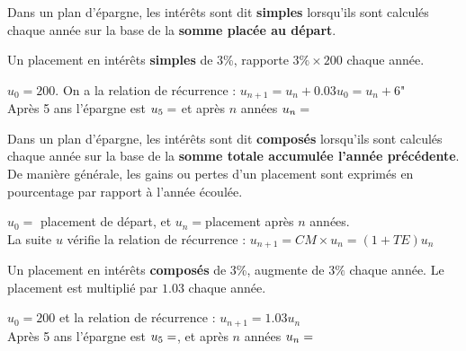 \documentclass[main.tex]{subfiles}
\begin{document}
 
 
 \newpage 
 
  \begin{eBox}
 	Dans un plan d'épargne, les intérêts sont dit \textbf{simples} lorsqu'ils sont calculés chaque année sur la base de la \textbf{somme placée au départ}. 
 \end{eBox}   
 \begin{example} 
	Un placement   en intérêts \textbf{simples} de 3\%, rapporte $3\%\times 200$ chaque année.
 	
\noindent  $u_0=200$. On a la relation de récurrence : $u_{n+1}= u_n+ 0.03u_0=u_n+6$"\\
Après 5 ans l'épargne est $u_5= \dotfill  $ et après $n$ années $u_n=\dotfill$

 \end{example}
 \begin{eBox}
 	Dans un plan d'épargne, les intérêts sont dit \textbf{composés} lorsqu'ils sont calculés chaque année sur la base de la \textbf{somme totale  accumulée l'année précédente}. De manière générale, les gains ou pertes d'un placement sont exprimés en pourcentage par rapport à l'année écoulée. 
 	
 \noindent	  $u_0=$   placement de départ, et $u_n=$placement après $n$ années. \\
 La suite $u$ vérifie la relation de récurrence :
 	$u_{n+1}=CM \times u_n=(1+TE) u_n$ 
 \end{eBox} 
\begin{example} 
Un placement   en intérêts \textbf{composés} de 3\%, augmente de $3\%$ chaque année. Le placement est multiplié par $1.03$ chaque année.
 
\noindent $u_0=200$ et la relation de récurrence : $u_{n+1}=1.03u_n$\\
Après 5 ans l'épargne est $u_5=  \dotfill  $, et après $n$ années $u_n=\dotfill $ 

\end{example}
\end{document}
